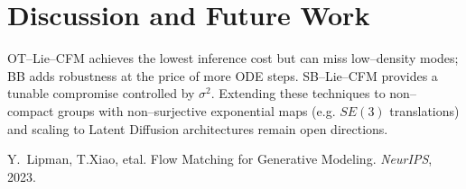 \documentclass[11pt]{article}
\begin{document}
\section{Discussion and Future Work}
OT--Lie--CFM achieves the lowest inference cost but can miss low--density modes; BB adds robustness at the price of more ODE steps.  SB--Lie--CFM provides a tunable compromise controlled by $\sigma^{2}$.  Extending these techniques to non--compact groups with non--surjective exponential maps (e.g. $SE(3)$ translations) and scaling to Latent Diffusion architectures remain open directions.


\begin{thebibliography}{9}
Y.~Lipman, T.Xiao, etal. Flow Matching for Generative Modeling. \emph{NeurIPS}, 2023.
\end{thebibliography}
\end{document}
